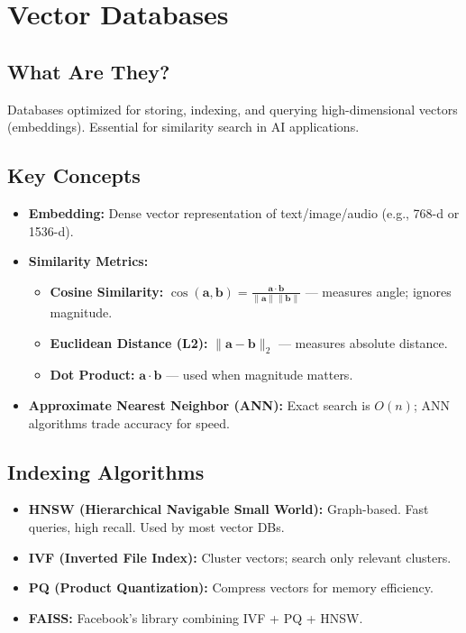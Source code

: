 \documentclass[11pt,a4paper]{article}
\begin{document}
\section{Vector Databases}

\subsection{What Are They?}
Databases optimized for storing, indexing, and querying high-dimensional vectors (embeddings). Essential for similarity search in AI applications.

\subsection{Key Concepts}
\begin{itemize}[nosep]
  \item \textbf{Embedding:} Dense vector representation of text/image/audio (e.g., 768-d or 1536-d).
  \item \textbf{Similarity Metrics:}
    \begin{itemize}[nosep]
      \item \textbf{Cosine Similarity:} $\cos(\mathbf{a}, \mathbf{b}) = \frac{\mathbf{a} \cdot \mathbf{b}}{\|\mathbf{a}\| \|\mathbf{b}\|}$ --- measures angle; ignores magnitude.
      \item \textbf{Euclidean Distance (L2):} $\|\mathbf{a} - \mathbf{b}\|_2$ --- measures absolute distance.
      \item \textbf{Dot Product:} $\mathbf{a} \cdot \mathbf{b}$ --- used when magnitude matters.
    \end{itemize}
  \item \textbf{Approximate Nearest Neighbor (ANN):} Exact search is $O(n)$; ANN algorithms trade accuracy for speed.
\end{itemize}

\subsection{Indexing Algorithms}
\begin{itemize}[nosep]
  \item \textbf{HNSW (Hierarchical Navigable Small World):} Graph-based. Fast queries, high recall. Used by most vector DBs.
  \item \textbf{IVF (Inverted File Index):} Cluster vectors; search only relevant clusters.
  \item \textbf{PQ (Product Quantization):} Compress vectors for memory efficiency.
  \item \textbf{FAISS:} Facebook's library combining IVF + PQ + HNSW.
\end{itemize}
\end{document}
